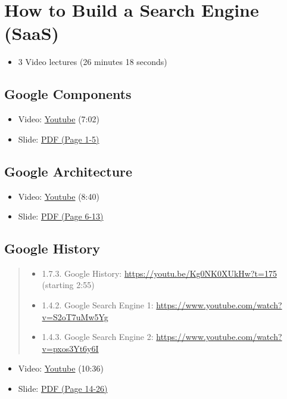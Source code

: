 \section{How to Build a Search Engine
(SaaS)}\label{how-to-build-a-search-engine-saas}

\begin{itemize}
\tightlist
\item
  3 Video lectures (26 minutes 18 seconds)
\end{itemize}

\subsection{Google Components}\label{google-components}

\begin{itemize}
\tightlist
\item
  Video: \href{https://www.youtube.com/watch?v=IWMcv7HbbPM}{Youtube}
  (7:02)
\item
  Slide:
  \href{https://drive.google.com/open?id=0B88HKpainTSfYWZ0dDlrNThkVms}{PDF
  (Page 1-5)}
\end{itemize}

\subsection{Google Architecture}\label{google-architecture}

\begin{itemize}
\tightlist
\item
  Video: \href{https://www.youtube.com/watch?v=syZHezdbdRY}{Youtube}
  (8:40)
\item
  Slide:
  \href{https://drive.google.com/open?id=0B88HKpainTSfYWZ0dDlrNThkVms}{PDF
  (Page 6-13)}
\end{itemize}

\subsection{Google History}\label{google-history}

\begin{quote}
\begin{itemize}
\tightlist
\item
  1.7.3. Google History: \url{https://youtu.be/Kg0NK0XUkHw?t=175}
  (starting 2:55)
\item
  1.4.2. Google Search Engine 1:
  \url{https://www.youtube.com/watch?v=S2oT7uMw5Yg}
\item
  1.4.3. Google Search Engine 2:
  \url{https://www.youtube.com/watch?v=pxos3Yt6y6I}
\end{itemize}
\end{quote}

\begin{itemize}
\tightlist
\item
  Video: \href{https://www.youtube.com/watch?v=Kg0NK0XUkHw}{Youtube}
  (10:36)
\item
  Slide:
  \href{https://drive.google.com/open?id=0B88HKpainTSfYWZ0dDlrNThkVms}{PDF
  (Page 14-26)}
\end{itemize}
